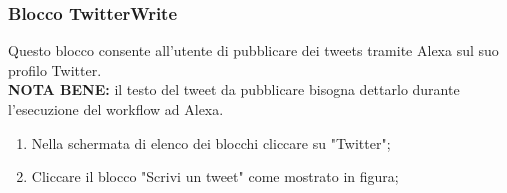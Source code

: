 \subsubsection{Blocco TwitterWrite} \label{twitterW}
Questo blocco consente all'utente di pubblicare dei tweets tramite Alexa sul suo profilo Twitter. \\
\textbf{NOTA BENE:} il testo del tweet da pubblicare bisogna dettarlo durante 	l'esecuzione del workflow ad Alexa.
\newpage
\begin{enumerate}
	\item Nella schermata di elenco dei blocchi cliccare su "Twitter";
	\item Cliccare il blocco "Scrivi un tweet" come mostrato in figura;
	\begin{figure}[!ht]
		\centering

\end{figure}
\end{enumerate}
